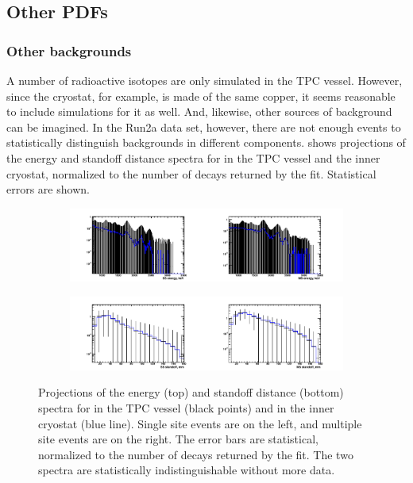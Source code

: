 \documentclass[herrin-thesis.tex]{subfiles}
\begin{document}
\subsection{Other PDFs}
\subsubsection{Other backgrounds}
A number of radioactive isotopes are only simulated in the TPC vessel. However, since the cryostat, for example, is made of the same copper, it seems reasonable to include simulations for it as well. And, likewise, other sources of background can be imagined. In the Run2a data set, however, there are not enough events to statistically distinguish backgrounds in different components.  shows projections of the energy and standoff distance spectra for  in the TPC vessel and the inner cryostat, normalized to the number of  decays returned by the fit. Statistical errors are shown.
 
\begin{figure}[tbp]
\centering
\begin{subfigure}[c]{\textwidth}
	\centering
	\includegraphics[trim = 1.25cm 0cm 1.25cm 0.5cm, clip=true, width=\textwidth]{./plots/analysis_degenerate_uranium_spectra_e.pdf}
\end{subfigure}
\begin{subfigure}[c]{\textwidth}
	\centering
	\includegraphics[trim = 1.25cm 0cm 1.25cm 0.5cm, clip=true, width=\textwidth]{./plots/analysis_degenerate_uranium_spectra_s.pdf}
\end{subfigure}
\caption[Lack of statistical power to distinguish the source of uranium backgrounds]{Projections of the energy (top) and standoff distance (bottom) spectra for  in the TPC vessel (black points) and in the inner cryostat (blue line). Single site events are on the left, and multiple site events are on the right. The error bars are statistical, normalized to the number of  decays returned by the fit. The two spectra are statistically indistinguishable without more data.}
\label{fig:analysis_degenerate_uranium_spectra}
\end{figure}
\end{document}
